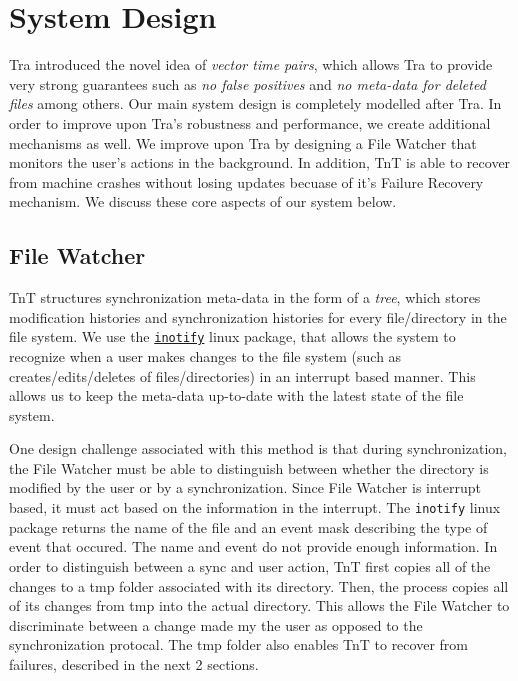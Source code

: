 \section{System Design}

Tra introduced the novel idea of {\em vector time pairs}, which allows Tra to provide very strong guarantees such as {\em no false positives} and {\em no meta-data for deleted files} among others. Our main system design is completely modelled after Tra.  In order to improve upon Tra's robustness and performance, we create additional mechanisms as well.  We improve upon Tra by designing a File Watcher that monitors the user's actions in the background.  In addition, TnT is able to recover from machine crashes without losing updates becuase of it's Failure Recovery mechanism.  We discuss these core aspects of our system below.

\subsection{File Watcher}
TnT structures synchronization meta-data in the form of a {\em tree}, which stores modification histories and synchronization histories for every file/directory in the file system. We use the \href{http://godoc.org/code.google.com/p/go.exp/inotify}{\tt inotify} linux package, that allows the system to recognize when a user makes changes to the file system (such as creates/edits/deletes of files/directories) in an interrupt based manner. This allows us to keep the meta-data up-to-date with the latest state of the file system.

One design challenge associated with this method is that during synchronization, the File Watcher must be able to distinguish between whether the directory is modified by the user or by a synchronization.  Since File Watcher is interrupt based, it must act based on the information in the interrupt.  The {\tt inotify} linux package returns the name of the file and an event mask describing the type of event that occured.  The name and event do not provide enough information.  In order to distinguish between a sync and user action, TnT first copies all of the changes to a tmp folder associated with its directory.  Then, the process copies all of its changes from tmp into the actual directory.  This allows the File Watcher to discriminate between a change made my the user as opposed to the synchronization protocal.  The tmp folder also enables TnT to recover from failures, described in the next 2 sections.

